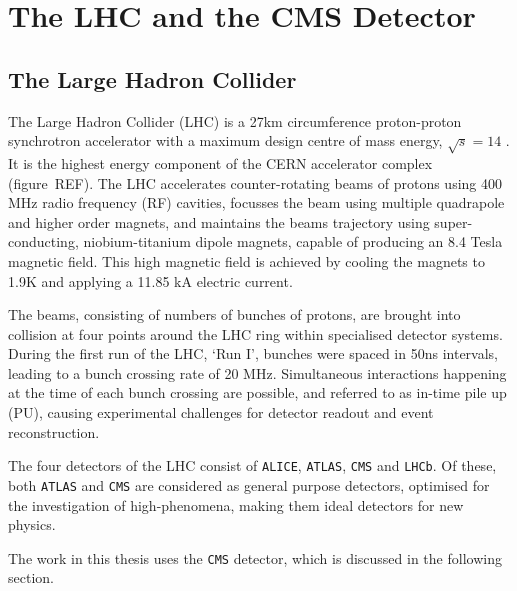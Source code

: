 \chapter{The LHC and the CMS Detector}

\ifpdf
    \graphicspath{{Chapter3/Figs/Raster/}{Chapter3/Figs/PDF/}{Chapter3/Figs/}}
\else
    \graphicspath{{Chapter3/Figs/Vector/}{Chapter3/Figs/}}
\fi


\section{The Large Hadron Collider}  %
\label{sec:detector_lhc}

The Large Hadron Collider (LHC) is a 27km circumference proton-proton 
synchrotron accelerator with a maximum design centre of mass energy,
$\sqrt{s} = 14$ \tev. It is the highest energy component of the CERN accelerator
complex (figure~REF). The LHC accelerates counter-rotating beams of protons 
using 400 MHz radio frequency
(RF) cavities, focusses the beam using multiple quadrapole and higher order magnets,
and maintains the beams trajectory using super-conducting, niobium-titanium 
dipole magnets, capable of producing an 8.4 Tesla magnetic field. This high 
magnetic field is achieved by cooling the magnets to 1.9K and applying a 11.85 
kA electric current.

The beams, consisting of numbers of bunches of protons, are brought into collision
at four points around the LHC ring within specialised detector systems. During the
first run of the LHC, `Run I', bunches were spaced in 50ns intervals, leading to
a bunch crossing rate of 20 MHz. Simultaneous interactions happening at the time
of each bunch crossing are possible, and referred to as in-time pile up (PU), 
causing experimental challenges for detector readout and event reconstruction. 

The four detectors of the LHC consist of \texttt{ALICE}, \texttt{ATLAS},
\texttt{CMS} and \texttt{LHCb}. Of these, both \texttt{ATLAS} and \texttt{CMS} 
are considered as general purpose detectors, optimised for the investigation of
high-\Pt phenomena, making them ideal detectors for new physics.

The work in this thesis uses the \texttt{CMS} detector, which is discussed in 
the following section.


